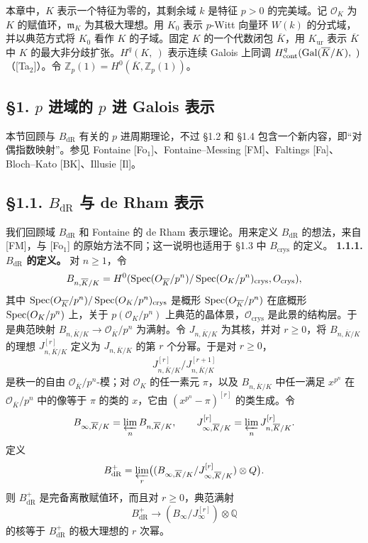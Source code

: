 本章中，$K$ 表示一个特征为零的，其剩余域 $k$ 是特征 $p>0$ 的完美域。记 $\mathcal O_K$ 为 $K$ 的赋值环，$\mathfrak m_K$ 为其极大理想。用 $K_0$ 表示 $p$-Witt 向量环 $W(k)$ 的分式域，并以典范方式将 $K_0$ 看作 $K$ 的子域。固定 $K$ 的一个代数闭包 $\overline K$，用 $K_{\mathrm{ur}}$ 表示 $\overline K$ 中 $K$ 的最大非分歧扩张。$H^q(K,\ )$ 表示连续 Galois 上同调
$H^q_{\mathrm{cont}}(\Gal(\overline K/K),\ )$（[Ta$_2$]）。令 $\mathbb Z_p(1)=H^0(\overline K,\mathbb Z_p(1))$。

\subsection*{§1. $p$ 进域的 $p$ 进 Galois 表示}
本节回顾与 $B_{\mathrm{dR}}$ 有关的 $p$ 进周期理论，不过 §1.2 和 §1.4 包含一个新内容，即“对偶指数映射”。参见 Fontaine [Fo$_1$]、Fontaine--Messing [FM]、Faltings [Fa]、Bloch--Kato [BK]、Illusie [Il]。

\subsection*{§1.1. $B_{\mathrm{dR}}$ 与 de Rham 表示}
我们回顾域 $B_{\mathrm{dR}}$ 和 Fontaine 的 de Rham 表示理论。用来定义 $B_{\mathrm{dR}}$ 的想法，来自 [FM]，与 [Fo$_1$] 的原始方法不同；这一说明也适用于 §1.3 中 $B_{\mathrm{crys}}$ 的定义。
\textbf{1.1.1. $B_{\mathrm{dR}}$ 的定义。} 对 $n\ge1$，令
\[
 B_{n,\overline K/K}=H^0(\Spec(\mathcal O_{\overline K}/p^n)/\Spec(\mathcal O_K/p^n)_{\mathrm{crys}},\mathcal O_{\mathrm{crys}}),
\]
其中 $\Spec(\mathcal O_{\overline K}/p^n)/\Spec(\mathcal O_K/p^n)_{\mathrm{crys}}$ 是概形 $\Spec(\mathcal O_{\overline K}/p^n)$ 在底概形 $\Spec(\mathcal O_K/p^n)$ 上，关于 $p(\mathcal O_K/p^n)$ 上典范的晶体景，$\mathcal O_{\mathrm{crys}}$ 是此景的结构层。于是典范映射
$B_{n,\overline K/K}\longrightarrow\mathcal O_{\overline K}/p^n$ 为满射。令 $J_{n,\overline K/K}$ 为其核，并对 $r\ge0$，将 $B_{n,\overline K/K}$ 的理想 $J^{[r]}_{n,\overline K/K}$ 定义为 $J_{n,\overline K/K}$ 的第 $r$ 个分幂。于是对 $r\ge0$，
\[
 J^{[r]}_{n,\overline K/K}/J^{[r+1]}_{n,\overline K/K}
\]
是秩一的自由 $\mathcal O_{\overline K}/p^n$-模；对 $\mathcal O_K$ 的任一素元 $\pi$，以及 $B_{n,\overline K/K}$ 中任一满足 $x^{p^n}$ 在 $\mathcal O_{\overline K}/p^n$ 中的像等于 $\pi$ 的类的 $x$，它由 $(x^{p^n}-\pi)^{[r]}$ 的类生成。令
\[
 B_{\infty,\overline K/K}=\varprojlim_n B_{n,\overline K/K},\qquad
 J^{[r]}_{\infty,\overline K/K}=\varprojlim_n J^{[r]}_{n,\overline K/K}.
\]
定义
\[
 B^+_{\mathrm{dR}}=\varprojlim_r\bigl((B_{\infty,\overline K/K}/J^{[r]}_{\infty,\overline K/K})\otimes\mathbb Q\bigr).
\]
则 $B^+_{\mathrm{dR}}$ 是完备离散赋值环，而且对 $r\ge0$，典范满射
\[
 B^+_{\mathrm{dR}}\longrightarrow(B_\infty/J_\infty^{[r]})\otimes\mathbb Q
\]
的核等于 $B^+_{\mathrm{dR}}$ 的极大理想的 $r$ 次幂。

